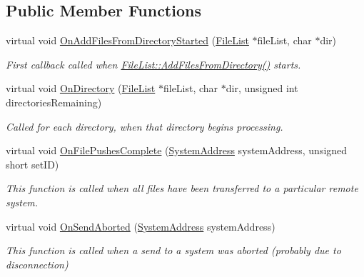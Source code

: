 \subsection*{Public Member Functions}
\begin{DoxyCompactItemize}
\item 
\hypertarget{class_rak_net_1_1_f_l_p___printf_a5aa9561852d03bd7fb21f8757d475842}{virtual void \hyperlink{class_rak_net_1_1_f_l_p___printf_a5aa9561852d03bd7fb21f8757d475842}{On\-Add\-Files\-From\-Directory\-Started} (\hyperlink{class_rak_net_1_1_file_list}{File\-List} $\ast$file\-List, char $\ast$dir)}\label{class_rak_net_1_1_f_l_p___printf_a5aa9561852d03bd7fb21f8757d475842}

\begin{DoxyCompactList}\small\item\em First callback called when \hyperlink{class_rak_net_1_1_file_list_a9ff81c1d5fb8ad1897fd6b6b12108cf8}{File\-List\-::\-Add\-Files\-From\-Directory()} starts. \end{DoxyCompactList}\item 
\hypertarget{class_rak_net_1_1_f_l_p___printf_a21c7f0b7118157129c3ae29c2c90773c}{virtual void \hyperlink{class_rak_net_1_1_f_l_p___printf_a21c7f0b7118157129c3ae29c2c90773c}{On\-Directory} (\hyperlink{class_rak_net_1_1_file_list}{File\-List} $\ast$file\-List, char $\ast$dir, unsigned int directories\-Remaining)}\label{class_rak_net_1_1_f_l_p___printf_a21c7f0b7118157129c3ae29c2c90773c}

\begin{DoxyCompactList}\small\item\em Called for each directory, when that directory begins processing. \end{DoxyCompactList}\item 
\hypertarget{class_rak_net_1_1_f_l_p___printf_aae5cf9d1c9f3f110ec9178c2e3f03965}{virtual void \hyperlink{class_rak_net_1_1_f_l_p___printf_aae5cf9d1c9f3f110ec9178c2e3f03965}{On\-File\-Pushes\-Complete} (\hyperlink{struct_rak_net_1_1_system_address}{System\-Address} system\-Address, unsigned short set\-I\-D)}\label{class_rak_net_1_1_f_l_p___printf_aae5cf9d1c9f3f110ec9178c2e3f03965}

\begin{DoxyCompactList}\small\item\em This function is called when all files have been transferred to a particular remote system. \end{DoxyCompactList}\item 
\hypertarget{class_rak_net_1_1_f_l_p___printf_aa57f07a01bea60305bd5e571f32c41c0}{virtual void \hyperlink{class_rak_net_1_1_f_l_p___printf_aa57f07a01bea60305bd5e571f32c41c0}{On\-Send\-Aborted} (\hyperlink{struct_rak_net_1_1_system_address}{System\-Address} system\-Address)}\label{class_rak_net_1_1_f_l_p___printf_aa57f07a01bea60305bd5e571f32c41c0}

\begin{DoxyCompactList}\small\item\em This function is called when a send to a system was aborted (probably due to disconnection) \end{DoxyCompactList}\end{DoxyCompactItemize}


